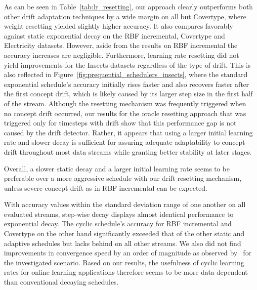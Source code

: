 \documentclass[letterpaper]{article} %
\begin{document}
As can be seen in Table~\ref{tab:lr_resetting}, our approach clearly outperforms both other drift adaptation techniques by a wide margin on all but Covertype, where weight resetting yielded slightly higher accuracy.
It also compares favorably against static exponential decay on the RBF incremental, Covertype and Electricity datasets.
However, aside from the results on RBF incremental the accuracy increases are negligible.
Furthermore, learning rate resetting did not yield improvements for the Insects datasets regardless of the type of drift.
This is also reflected in Figure~\ref{fig:prequential_schedulers_insects}, where the standard exponential schedule's accuracy initially rises faster and also recovers faster after the first concept drift, which is likely caused by its larger step size in the first half of the stream.
Although the resetting mechanism was frequently triggered when no concept drift occurred, our results for the oracle resetting approach that was triggered only for timesteps with drift show that this performance gap is not caused by the drift detector.
Rather, it appears that using a larger initial learning rate and slower decay is sufficient for assuring adequate adaptability to concept drift throughout most data streams while granting better stability at later stages.

Overall, a slower static decay and a larger initial learning rate seems to be preferable over a more aggressive schedule with our drift resetting mechanism, unless severe concept drift as in RBF incremental can be expected.

With accuracy values within the standard deviation range of one another on all evaluated streams, step-wise decay displays almost identical performance to exponential decay.
The cyclic schedule's accuracy for RBF incremental and Covertype on the other hand significantly exceeded that of the other static and adaptive schedules but lacks behind on all other streams.
We also did not find improvements in convergence speed by an order of magnitude as observed by~\cite{smithSuperConvergenceVeryFast2018a} for the investigated scenario.
Based on our results, the usefulness of cyclic learning rates for online learning applications therefore seems to be more data dependent than conventional decaying schedules.
\end{document}
